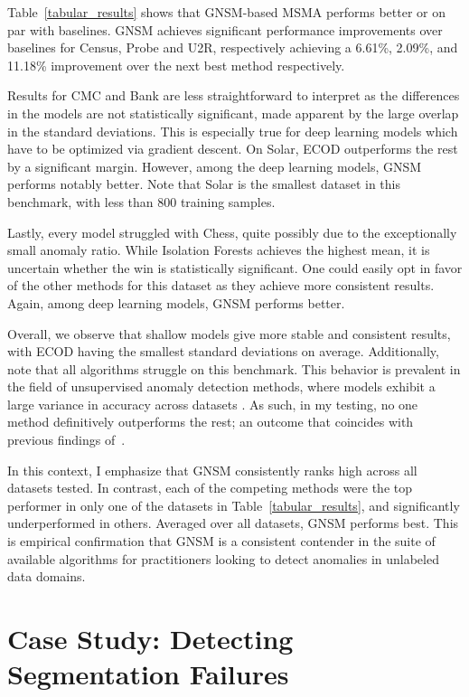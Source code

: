 Table~\ref{tabular_results} shows that GNSM-based MSMA performs better or on par with baselines. GNSM achieves significant performance improvements over baselines for Census, Probe and U2R, respectively achieving a 6.61\%, 2.09\%, and 11.18\% improvement over the next best method respectively.

Results for CMC and Bank are less straightforward to interpret as the differences in the models are not statistically significant, made apparent by the large overlap in the standard deviations. This is especially true for deep learning models which have to be optimized via gradient descent. On Solar, ECOD outperforms the rest by a significant margin. However, among the deep learning models, GNSM performs notably better. Note that Solar is the smallest dataset in this benchmark, with less than 800 training samples.

Lastly, every model struggled with Chess, quite possibly due to the exceptionally small anomaly ratio. While Isolation Forests achieves the highest mean, it is uncertain whether the win is statistically significant. One could easily opt in favor of the other methods for this dataset as they achieve more consistent results. Again, among deep learning models, GNSM performs better.

Overall, we observe that shallow models give more stable and consistent results, with ECOD having the smallest standard deviations on average. Additionally, note that all algorithms struggle on this benchmark. This behavior is prevalent in the field of unsupervised anomaly detection methods, where models exhibit a large variance in accuracy across datasets \cite{han2022adbench}.
As such, in my testing, no one method definitively outperforms the rest; an outcome that coincides with previous findings of~\cite{han2022adbench, pang_deep_2021, ruff_unifying_2021}.

In this context, I emphasize that GNSM consistently ranks high across all datasets tested. In contrast, each of the competing methods were the top performer in only one of the datasets in Table~\ref{tabular_results}, and significantly underperformed in others. Averaged over all datasets, GNSM performs best. This is empirical confirmation that GNSM is a consistent contender in the suite of available algorithms for practitioners looking to detect anomalies in unlabeled data domains.

\section{Case Study: Detecting Segmentation Failures}

